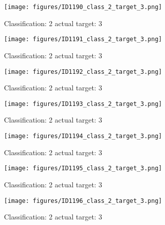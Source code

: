 \begin{figure}[h!]
\begin{center}
\texttt{[image: figures/ID1190\_class\_2\_target\_3.png]}
\end{center}
\caption{ Classification: 2 actual target: 3}
\label{fig:ID1190_class_2_target_3}
\end{figure}
\begin{figure}[h!]
\begin{center}
\texttt{[image: figures/ID1191\_class\_2\_target\_3.png]}
\end{center}
\caption{ Classification: 2 actual target: 3}
\label{fig:ID1191_class_2_target_3}
\end{figure}
\begin{figure}[h!]
\begin{center}
\texttt{[image: figures/ID1192\_class\_2\_target\_3.png]}
\end{center}
\caption{ Classification: 2 actual target: 3}
\label{fig:ID1192_class_2_target_3}
\end{figure}
\begin{figure}[h!]
\begin{center}
\texttt{[image: figures/ID1193\_class\_2\_target\_3.png]}
\end{center}
\caption{ Classification: 2 actual target: 3}
\label{fig:ID1193_class_2_target_3}
\end{figure}
\begin{figure}[h!]
\begin{center}
\texttt{[image: figures/ID1194\_class\_2\_target\_3.png]}
\end{center}
\caption{ Classification: 2 actual target: 3}
\label{fig:ID1194_class_2_target_3}
\end{figure}
\begin{figure}[h!]
\begin{center}
\texttt{[image: figures/ID1195\_class\_2\_target\_3.png]}
\end{center}
\caption{ Classification: 2 actual target: 3}
\label{fig:ID1195_class_2_target_3}
\end{figure}
\begin{figure}[h!]
\begin{center}
\texttt{[image: figures/ID1196\_class\_2\_target\_3.png]}
\end{center}
\caption{ Classification: 2 actual target: 3}
\label{fig:ID1196_class_2_target_3}
\end{figure}
